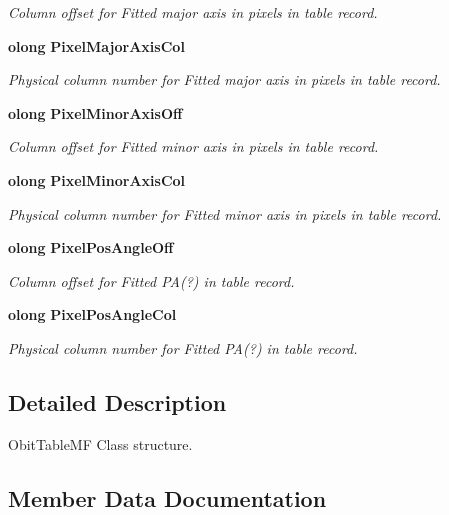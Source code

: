 \begin{CompactItemize}
\begin{CompactList}\small\item\em Column offset for Fitted major axis in pixels in table record. \item\end{CompactList}\item 
{\bf olong} {\bf Pixel\-Major\-Axis\-Col}
\begin{CompactList}\small\item\em Physical column number for Fitted major axis in pixels in table record. \item\end{CompactList}\item 
{\bf olong} {\bf Pixel\-Minor\-Axis\-Off}
\begin{CompactList}\small\item\em Column offset for Fitted minor axis in pixels in table record. \item\end{CompactList}\item 
{\bf olong} {\bf Pixel\-Minor\-Axis\-Col}
\begin{CompactList}\small\item\em Physical column number for Fitted minor axis in pixels in table record. \item\end{CompactList}\item 
{\bf olong} {\bf Pixel\-Pos\-Angle\-Off}
\begin{CompactList}\small\item\em Column offset for Fitted PA(?) in table record. \item\end{CompactList}\item 
{\bf olong} {\bf Pixel\-Pos\-Angle\-Col}
\begin{CompactList}\small\item\em Physical column number for Fitted PA(?) in table record. \item\end{CompactList}\end{CompactItemize}


\subsection{Detailed Description}
Obit\-Table\-MF Class structure. 



\subsection{Member Data Documentation}
